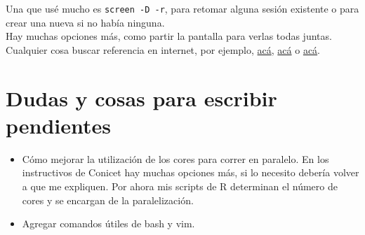 \documentclass[paper=a4, fontsize=11pt]{scrartcl} %
\numberwithin{equation}{section} %
\numberwithin{figure}{section} %
\numberwithin{table}{section} %
\begin{document}
Una que usé mucho es \texttt{screen -D -r}, para retomar alguna sesión existente o para crear una nueva si no había ninguna.\\

Hay muchas opciones más, como partir la pantalla para verlas todas juntas. Cualquier cosa buscar referencia en internet, por ejemplo, \href{https://ma.ttias.be/screen-a-must-for-ssh/}{acá}, \href{https://linuxize.com/post/how-to-use-linux-screen/}{acá} o \href{https://www.howtogeek.com/howto/ubuntu/keep-your-ssh-session-running-when-you-disconnect/}{acá}.

\section{Dudas y cosas para escribir pendientes}

\begin{itemize}
	\item Cómo mejorar la utilización de los cores para correr en paralelo. En los instructivos de Conicet hay muchas opciones más, si lo necesito debería volver a que me expliquen. Por ahora mis scripts de R determinan el número de cores y se encargan de la paralelización.

	\item Agregar comandos útiles de bash y vim.
\end{itemize}
\end{document}
